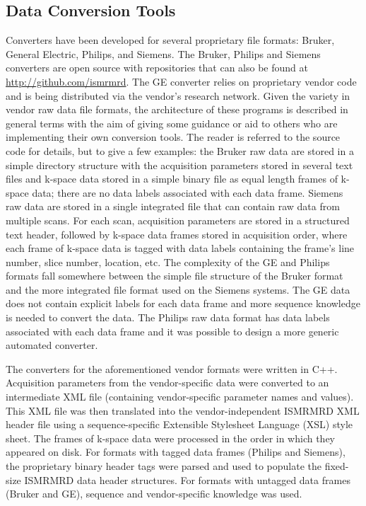 \documentclass[12pt]{article}
\begin{document}
\subsection*{Data Conversion Tools}
Converters have been developed for several proprietary file formats: Bruker, General Electric, Philips, and Siemens.  The Bruker, Philips and Siemens converters are open source with repositories that can also be found at \url{http://github.com/ismrmrd}.  The GE converter relies on proprietary vendor code and is being distributed via the vendor's research network.  Given the variety in vendor raw data file formats, the architecture of these programs is described in general terms with the aim of giving some guidance or aid to others who are implementing their own conversion tools.  The reader is referred to the source code for  details, but to give a few examples: the Bruker raw data are stored in a simple directory structure with the acquisition parameters stored in several text files and k-space data stored in a simple binary file as equal length frames of k-space data; there are no data labels associated with each data frame. Siemens raw data are stored in a single integrated file that can contain raw data from multiple scans.  For each scan, acquisition parameters are stored in a structured text header, followed by k-space data frames stored in acquisition order, where each frame of k-space data is tagged with data labels containing the frame's line number, slice number, location, etc. The complexity of the GE and Philips formats fall somewhere between the simple file structure of the Bruker format and the more integrated file format used on the Siemens systems. The GE data does not contain explicit labels for each data frame and more sequence knowledge is needed to convert the data. The Philips raw data format has data labels associated with each data frame and it was possible to design a more generic automated converter.   

The converters for the aforementioned vendor formats were written in C++. Acquisition parameters from the vendor-specific data were converted to an intermediate XML file (containing vendor-specific parameter names and values). This  XML file was then translated into the vendor-independent ISMRMRD XML header file using a sequence-specific Extensible Stylesheet Language (XSL) style sheet. The frames of k-space data were processed in the order in which they appeared on disk.  For formats with tagged data frames (Philips and Siemens), the proprietary binary header tags were parsed and used to populate the fixed-size ISMRMRD data header structures.  For formats with untagged data frames (Bruker and GE), sequence and vendor-specific knowledge was used.  
\end{document}
